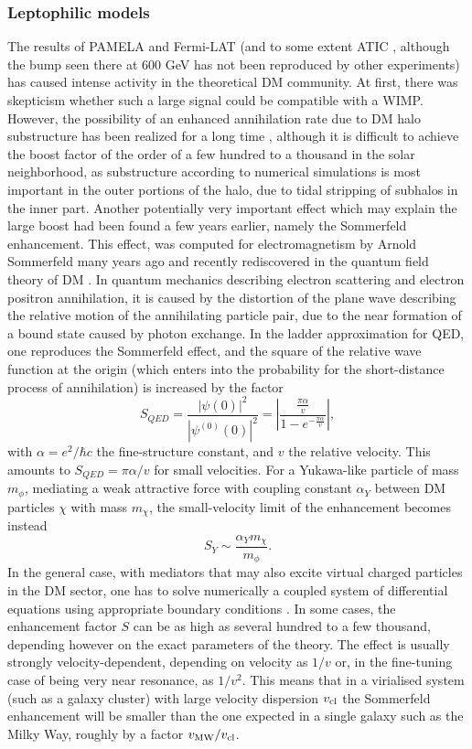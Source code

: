 \documentclass[10pt,aps,pra,reprint,amsmath,amsfonts,amssymb,showpacs,nofootinbib,floatfix]{revtex4-1}
\begin{document}
\subsubsection{Leptophilic models}
\label{sect:LP}
The results of PAMELA \cite{Adriani:2008zr} and Fermi-LAT
\cite{Abdo:2009zk} (and to some extent ATIC
\cite{2008Natur.456..362C}, although the bump seen there at 600 GeV
has not been reproduced by other experiments) has caused intense
activity in the theoretical DM community. At first, there was
skepticism whether such a large signal could be compatible with a
WIMP. However, the possibility of an enhanced annihilation rate due to
DM halo substructure has been realized for a long time
\cite{1993ApJ...411..439S,Bergstrom:1998zs,Moore:1999nt}, although it
is difficult to achieve the boost factor of the order of a few hundred
to a thousand in the solar neighborhood, as substructure according to
numerical simulations is most important in the outer portions of the
halo, due to tidal stripping of subhalos in the inner part. Another
potentially very important effect which may explain the large boost
had been found a few years earlier, namely the Sommerfeld
enhancement. This effect, was computed for electromagnetism by Arnold
Sommerfeld many years ago \cite{sommerfeld} and recently rediscovered
in the quantum field theory of DM
\cite{2005PhRvD..71f3528H,2007NuPhB.787..152C,2009PhRvD..79a5014A}.
In quantum mechanics describing electron scattering and electron
positron annihilation, it is caused by the distortion of the plane
wave describing the relative motion of the annihilating particle pair,
due to the near formation of a bound state caused by photon
exchange. In the ladder approximation for QED, one reproduces the
Sommerfeld effect, and the square of the relative wave function at the
origin (which enters into the probability for the short-distance
process of annihilation) is increased by the factor
\cite{2009PhRvD..79a5014A}
$$
S_{QED}=\frac{|\psi(0)|^2}{|\psi^{(0)}(0)|^2}=
\left|\frac{\frac{\pi\alpha}{v}}{1-e^{-\frac{\pi\alpha}{v}}}\right|,
$$ 
with $\alpha =e^2/\hbar c$ the fine-structure constant, and $v$ the relative
velocity. This amounts to $S_{QED}=\pi\alpha/v$ for small velocities. For a
Yukawa-like particle of mass $m_\phi$, mediating a weak attractive force with
coupling constant $\alpha_Y$ between DM particles $\chi$ with mass
$m_\chi$, the small-velocity limit of the enhancement becomes instead
$$
S_Y\sim\frac{\alpha_Y m_\chi}{m_\phi}.
$$ In the general case, with mediators that may also excite virtual
charged particles in the DM sector, one has to solve numerically a
coupled system of differential equations using appropriate boundary
conditions
\cite{2005PhRvD..71f3528H,2007NuPhB.787..152C,2009PhRvD..79a5014A}. In
some cases, the enhancement factor $S$ can be as high as several
hundred to a few thousand, depending however on the exact parameters
of the theory. The effect is usually strongly velocity-dependent,
depending on velocity as $1/v$ or, in the fine-tuning case of being
very near resonance, as $1/v^2$. This means that in a virialised
system (such as a galaxy cluster) with large velocity dispersion
$v_{\rm cl}$ the Sommerfeld enhancement will be smaller than the one
expected in a single galaxy such as the Milky Way, roughly by a factor
$v_{\rm MW}/v_{\rm cl}$.
\end{document}
